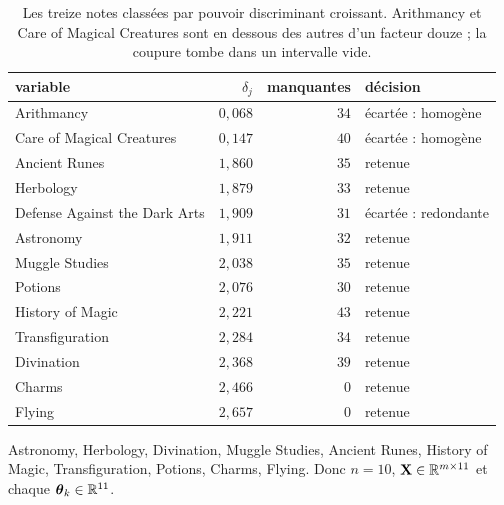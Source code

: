\begin{table}[htbp]
\centering
\setlength{\tabcolsep}{7pt}
\begin{tabular}{lrrl}
\toprule
variable & $\delta_j$ & manquantes & décision \\
\midrule
\cellcolor{warning!14}Arithmancy                & \cellcolor{warning!14}$0{,}068$ & \cellcolor{warning!14}$34$ & \cellcolor{warning!14}écartée : homogène \\
\cellcolor{warning!14}Care of Magical Creatures & \cellcolor{warning!14}$0{,}147$ & \cellcolor{warning!14}$40$ & \cellcolor{warning!14}écartée : homogène \\
\midrule
Ancient Runes                & $1{,}860$ & $35$ & retenue \\
Herbology                    & $1{,}879$ & $33$ & retenue \\
\cellcolor{warning!14}Defense Against the Dark Arts & \cellcolor{warning!14}$1{,}909$ & \cellcolor{warning!14}$31$ & \cellcolor{warning!14}écartée : redondante \\
Astronomy                    & $1{,}911$ & $32$ & retenue \\
Muggle Studies               & $2{,}038$ & $35$ & retenue \\
Potions                      & $2{,}076$ & $30$ & retenue \\
History of Magic             & $2{,}221$ & $43$ & retenue \\
Transfiguration              & $2{,}284$ & $34$ & retenue \\
Divination                   & $2{,}368$ & $39$ & retenue \\
Charms                       & $2{,}466$ & $0$  & retenue \\
Flying                       & $2{,}657$ & $0$  & retenue \\
\bottomrule
\end{tabular}
\caption{Les treize notes classées par pouvoir discriminant croissant. Arithmancy
et Care of Magical Creatures sont en dessous des autres d'un facteur douze ; la
coupure tombe dans un intervalle vide.}
\label{tab:feature-selection}
\end{table}

\begin{resultat}
Astronomy, Herbology, Divination, Muggle Studies, Ancient Runes,
History of Magic, Transfiguration, Potions, Charms, Flying.
Donc $n=10$, $\mathbf{X}\in\mathbb{R}^{m\times11}$ et chaque $\boldsymbol{\theta}_k\in\mathbb{R}^{11}$.
\end{resultat}

